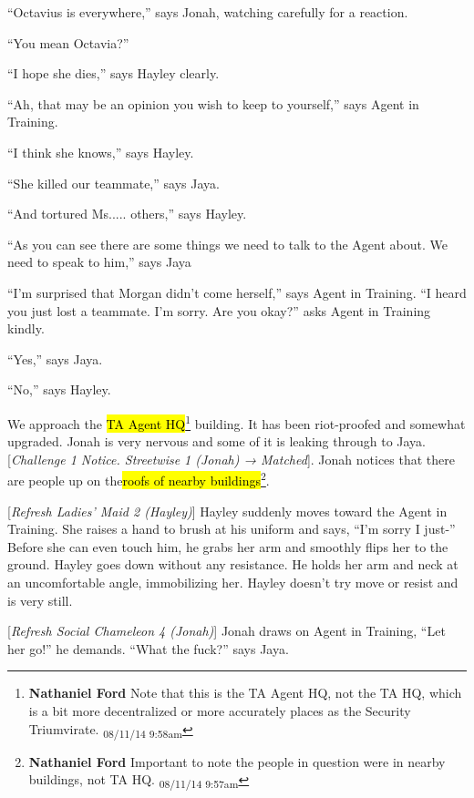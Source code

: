 ``Octavius is everywhere,'' says Jonah, watching carefully for a reaction.

``You mean Octavia?''

``I hope she dies,'' says Hayley clearly.

``Ah, that may be an opinion you wish to keep to yourself,'' says Agent in Training.

``I think she knows,'' says Hayley.

``She killed our teammate,'' says Jaya.

``And tortured Ms..... others,'' says Hayley.

``As you can see there are some things we need to talk to the Agent about.  We need to speak to him,'' says Jaya

``I'm surprised that Morgan didn't come herself,'' says Agent in Training.  ``I heard you just lost a teammate.  I'm sorry.  Are you okay?'' asks Agent in Training kindly.

``Yes,'' says Jaya.

``No,'' says Hayley.



We approach the \hl{TA Agent HQ}\footnote{\textbf{Nathaniel Ford }Note that this is the TA Agent HQ, not the TA HQ, which is a bit more decentralized or more accurately places as the Security Triumvirate. \textsubscript{08/11/14 9:58am}} building.  It has been riot-proofed and somewhat upgraded.  Jonah is very nervous and some of it is leaking through to Jaya.  {[}\textit{Challenge 1 Notice.  Streetwise 1 (Jonah) → Matched}{]}.  Jonah notices that there are people up on the\hl{roofs of nearby buildings}\footnote{\textbf{Nathaniel Ford }Important to note the people in question were in nearby buildings, not TA HQ. \textsubscript{08/11/14 9:57am}}.



{[}\textit{Refresh Ladies' Maid 2 (Hayley)}{]} Hayley suddenly moves toward the Agent in Training.  She raises a hand to brush at his uniform and says, ``I'm sorry I just-''  Before she can even touch him, he grabs her arm and smoothly flips her to the ground.  Hayley goes down without any resistance.  He holds her arm and neck at an uncomfortable angle, immobilizing her.  Hayley doesn't try move or resist and is very still. 



{[}\textit{Refresh Social Chameleon 4 (Jonah)}{]} Jonah draws on Agent in Training, ``Let her go!'' he demands.  ``What the fuck?'' says Jaya.  

